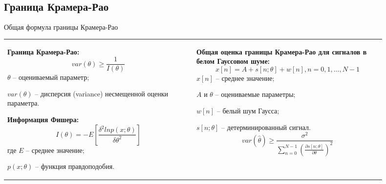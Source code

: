 \subsection{Граница Крамера-Рао}
\begin{frame}{Общая формула границы Крамера-Рао}
\begin{tabular}{m{0.45\linewidth}m{0.45\linewidth}}
\textbf{Граница Крамера-Рао:}
\begin{equation}
\label{eq:equation13}
var(\theta)\geq \frac{1}{I(\theta)}
\end{equation}
$\theta$ – оцениваемый параметр;
		
$var(\theta)$ – дисперсия (variance) несмещенной оценки параметра.

\textbf{Информация Фишера:}
\begin{equation}
	\label{eq:equation14}
	I(\theta) = -E \left[\frac{\delta^2 ln p(x;\theta)}{\delta\theta^2}\right]
\end{equation}
где $E$ – среднее значение;

$p(x;\theta)$ – функция правдоподобия.
&
\textbf{Общая оценка границы Крамера-Рао для сигналов в белом Гауссовом шуме:}
\begin{equation}
	\label{eq:equation14}
x[n] = A + s[n;\theta] + w[n], n=0,1,...,N-1	
\end{equation}
$x[n]$ -- среднее значение;

$A$ и $\theta$  -- оцениваемые параметры;

$w[n]$ -- белый шум Гаусса;

$s[n;\theta]$ -- детерминированный сигнал.
\begin{equation}
\label{eq:equation14}
var(\hat{\theta}) \geq \frac{\sigma^2}{\displaystyle\sum_{n=0}^{N-1} \left(\frac{\partial s [n; \theta]}{\partial\theta}\right)^2} 
\end{equation}
\end{tabular}
\end{frame}

